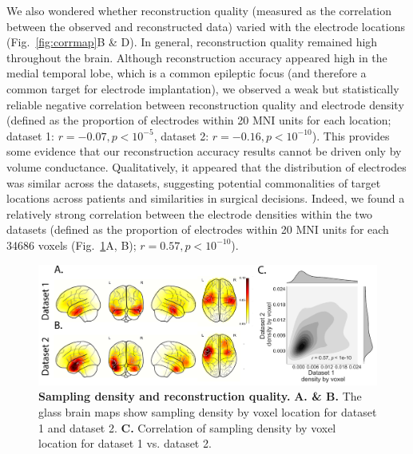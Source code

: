 \documentclass[11pt]{article}
\begin{document}
We also wondered whether reconstruction quality (measured as the
correlation between the observed and reconstructed data) varied with
the electrode locations (Fig.~\ref{fig:corrmap}B \& D). In general, reconstruction quality remained high throughout the brain. Although reconstruction accuracy appeared high in the medial temporal lobe, which is a common epileptic focus (and therefore a common target for electrode implantation), we observed a weak but statistically reliable negative correlation between reconstruction quality and electrode density (defined as the proportion of electrodes within 20 MNI units for each location; dataset 1: $r = -0.07, p < 10^{-5}$, dataset 2: $r = -0.16, p < 10^{-10}$). This provides some evidence that our reconstruction accuracy results cannot be driven only by volume conductance.  Qualitatively, it appeared that the distribution of electrodes was similar across the datasets, suggesting potential commonalities of target locations across patients and similarities in surgical decisions. Indeed, we found a relatively strong correlation between the electrode densities within the two datasets (defined as the proportion of electrodes within 20 MNI units for each 34686 voxels (Fig.~\ref{fig:density}A, B); $r = 0.57, p < 10^{-10}$).  



\begin{figure}
  \centering
  \includegraphics[width=\textwidth]{figs/density}
  \caption{\textbf{Sampling density and reconstruction quality.}
    \textbf{A. \& B. } The glass brain maps show sampling density by voxel location for dataset 1 and dataset 2. \textbf{C.}
      Correlation of sampling density by voxel location for dataset 1 vs. dataset 2.}
  \label{fig:density}
\end{figure}
\end{document}
